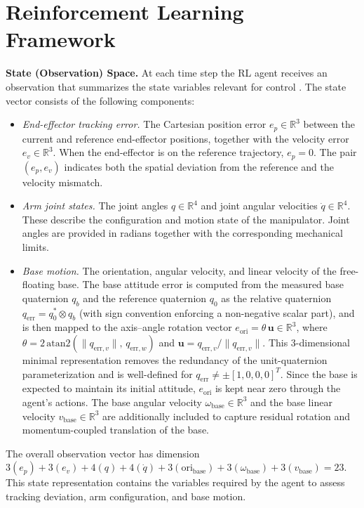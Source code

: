 \documentclass{ieeeaccess}
\begin{document}
\section{Reinforcement Learning Framework}\label{RL}
\textbf{State (Observation) Space.} At each time step the RL agent receives an observation that
summarizes the state variables relevant for control \cite{b7}. The state vector consists of the
following components:
\begin{itemize}
  \item \textit{End-effector tracking error.} The Cartesian position error $e_p \in \mathbb{R}^3$ between the current
  and reference end-effector positions, together with the velocity error $e_v \in \mathbb{R}^3$. When the
end-effector is on the reference trajectory, $e_p = 0$. The pair $(e_p, e_v)$
indicates both the spatial deviation from the reference and the velocity mismatch.
  \item \textit{Arm joint states.} The joint angles $q \in \mathbb{R}^4$ and joint angular velocities
  $\dot{q} \in \mathbb{R}^4$. These describe the configuration and motion state of the manipulator. Joint
  angles are provided in radians together with the corresponding mechanical limits.
  \item \textit{Base motion.} The orientation, angular velocity, and linear velocity of the free-floating base.
  The base attitude error is computed from the measured base quaternion $q_b$ and the
  reference quaternion $q_0$ as the relative quaternion $q_{\mathrm{err}} = q_0^{*} \otimes q_b$ (with sign
  convention enforcing a non-negative scalar part), and is then mapped to the axis--angle rotation
  vector $e_{\mathrm{ori}} = \theta\,\mathbf{u} \in \mathbb{R}^3$, where $\theta = 2\,\mathrm{atan2}(\|q_{\mathrm{err},v}\|,\,q_{\mathrm{err},w})$ and $\mathbf{u} = q_{\mathrm{err},v}/\|q_{\mathrm{err},v}\|$.
  This 3-dimensional minimal representation removes the redundancy of the unit-quaternion parameterization and is well-defined
  for $q_{\mathrm{err}} \neq \pm[1,0,0,0]^T$. Since the base is expected to maintain its initial attitude,
  $e_{\mathrm{ori}}$ is kept near zero through the agent's actions. The base angular velocity $\omega_{\mathrm{base}} \in \mathbb{R}^3$
  and the base linear velocity $v_{\mathrm{base}} \in \mathbb{R}^3$ are additionally included to capture residual
  rotation and momentum-coupled translation of the base.
\end{itemize}

The overall observation vector has dimension $3(e_p) + 3(e_v) + 4(q) + 4(\dot{q}) + 3(\mathrm{ori}_{\mathrm{base}}) + 3(\omega_{\mathrm{base}}) + 3(v_{\mathrm{base}}) = 23$.
This state representation contains the variables required by the agent to assess tracking deviation,
arm configuration, and base motion.
\end{document}
